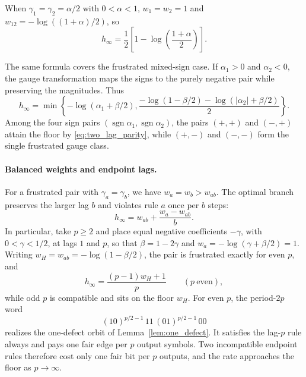 \documentclass[11pt,a4paper]{article}
\begin{document}
When $\gamma_1=\gamma_2=\alpha/2$ with $0<\alpha<1$, $w_1=w_2=1$ and
$w_{12}=-\log((1+\alpha)/2)$, so
\begin{equation}
\label{eq:balanced_order_two}
    h_\infty
    =\frac12\left[1-
      \log\left(\frac{1+\alpha}{2}\right)\right].
\end{equation}

The same formula covers the frustrated mixed-sign case.  If
$\alpha_1>0$ and $\alpha_2<0$, the gauge transformation maps the signs
to the purely negative pair while preserving the magnitudes.  Thus
\begin{equation}
\label{eq:mixed_order_two}
    h_\infty
    =\min\left\{
        -\log(\alpha_1+\beta/2),
        \frac{-\log(1-\beta/2)
              -\log(|\alpha_2|+\beta/2)}{2}
      \right\}.
\end{equation}
Among the four sign pairs
$(\operatorname{sgn}\alpha_1,\operatorname{sgn}\alpha_2)$, the pairs
$(+,+)$ and $(-,+)$ attain the floor by
\eqref{eq:two_lag_parity}, while $(+,-)$ and $(-,-)$ form the single
frustrated gauge class.

\paragraph{Balanced weights and endpoint lags.}
For a frustrated pair with $\gamma_a=\gamma_b$, we have
$w_a=w_b>w_{ab}$.  The optimal branch
preserves the larger lag $b$ and violates rule $a$ once per $b$ steps:
\begin{equation}
\label{eq:balanced_two_lag}
    h_\infty=w_{ab}+\frac{w_a-w_{ab}}{b}.
\end{equation}
In particular, take $p\ge2$ and place equal negative coefficients
$-\gamma$, with $0<\gamma<1/2$, at lags $1$ and $p$, so that $\beta=1-2\gamma$ and
$w_a=-\log(\gamma+\beta/2)=1$.  Writing
$w_H=w_{ab}=-\log(1-\beta/2)$, the pair is frustrated exactly for
even $p$, and
\begin{equation}
\label{eq:dual_endpoint}
    h_\infty=\frac{(p-1)w_H+1}{p}
    \qquad(p\ \text{even}),
\end{equation}
while odd $p$ is compatible and sits on the floor $w_H$.  For even
$p$, the period-$2p$ word
\[
    (10)^{p/2-1}\,11\,(01)^{p/2-1}\,00
\]
realizes the one-defect orbit of Lemma~\ref{lem:one_defect}.  It
satisfies the lag-$p$ rule always and pays one fair edge per $p$
output symbols.  Two incompatible endpoint rules therefore cost only
one fair bit per $p$ outputs, and the rate approaches the floor as
$p\to\infty$.
\end{document}
